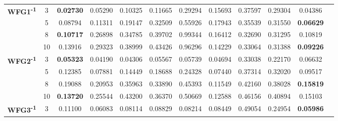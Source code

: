 \documentclass{sig-alternate}
\begin{document}
\begin{table}[!htb]
\begin{tabular}{|c|c|c|c|c|c|c|c|c|c|c|c|}
\multirow{4}{*}{\textbf{WFG1\textsuperscript{-1}}}  & 3          & \textbf{0.02730} & 0.05290           & 0.10325               & 0.11665          & 0.29294             & 0.15693             & 0.37597            & 0.29304              & 0.04386          \\ \cline{2-11} 
                                                      & 5          & 0.08794          & 0.11311           & 0.19147               & 0.32509          & 0.55926             & 0.17943             & 0.35539            & 0.31550              & \textbf{0.06629} \\ \cline{2-11} 
                                                      & 8          & \textbf{0.10717} & 0.26898           & 0.34785               & 0.39702          & 0.99344             & 0.16412             & 0.32690            & 0.31295              & 0.10819          \\ \cline{2-11} 
                                                      & 10         & 0.13916          & 0.29323           & 0.38999               & 0.43426          & 0.96296             & 0.14229             & 0.33064            & 0.31388              & \textbf{0.09226} \\ \hline
\multirow{4}{*}{\textbf{WFG2\textsuperscript{-1}}}  & 3          & \textbf{0.05323} & 0.04190           & 0.04306               & 0.05567          & 0.05739             & 0.04694             & 0.33038            & 0.22170              & 0.06632          \\ \cline{2-11} 
                                                      & 5          & 0.12385          & 0.07881           & 0.14449               & 0.18688          & 0.24328             & 0.07440             & 0.37314            & 0.32020              & 0.09517          \\ \cline{2-11} 
                                                      & 8          & 0.19088          & 0.20953           & 0.35963               & 0.33890          & 0.45393             & 0.11549             & 0.42160            & 0.38028              & \textbf{0.15819} \\ \cline{2-11} 
                                                      & 10         & \textbf{0.13720} & 0.25544           & 0.43200               & 0.36370          & 0.50669             & 0.12588             & 0.46156            & 0.40894              & 0.15103          \\ \hline
\multirow{4}{*}{\textbf{WFG3\textsuperscript{-1}}}  & 3          & 0.11100          & 0.06083           & 0.08114               & 0.08829          & 0.08214             & 0.08449             & 0.49054            & 0.24954              & \textbf{0.05986} \\ \cline{2-11} 

\end{tabular}
\end{table}
\end{document}
